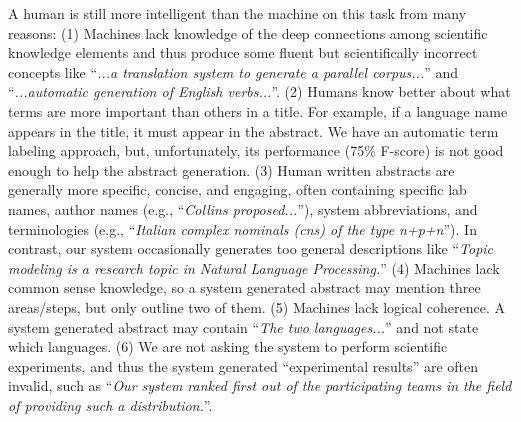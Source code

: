 \documentclass[11pt,a4paper]{article}
\begin{document}
 A human is still more intelligent than the machine on this task from many reasons: (1) Machines lack knowledge of the deep connections among scientific knowledge elements and thus produce some fluent but scientifically incorrect concepts like ``\textit{...a translation system to generate a parallel corpus...}'' and  ``\textit{...automatic generation of English verbs...}''. (2) Humans know better about what terms are more important than others in a title. For example, if a language name appears in the title, it must appear in the abstract. We have an automatic term labeling approach, but, unfortunately, its performance (75\% F-score) is not good enough to help the abstract generation. (3) Human written abstracts are generally more specific, concise, and engaging, often containing specific lab names, author names (e.g., ``\textit{Collins proposed...}''), system abbreviations, and terminologies (e.g., ``\textit{Italian complex nominals (cns) of the type n+p+n}''). In contrast, our system occasionally generates too general descriptions like ``\textit{Topic modeling is a research topic in Natural Language Processing.}'' (4) Machines lack common sense knowledge, so a system generated abstract may mention three areas/steps, but only outline two of them. (5) Machines lack logical coherence. A system generated abstract may contain ``\textit{The two languages...}'' and not state which languages. (6) We are not asking the system to perform scientific experiments, and thus the system generated ``experimental results'' are often invalid, such as ``\textit{Our system ranked first out of the participating teams in the field of providing such a distribution.}''.
\end{document}
